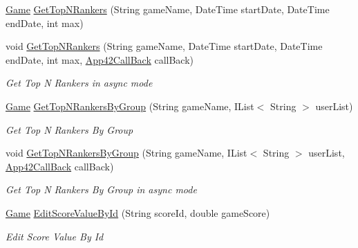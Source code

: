 \begin{DoxyCompactItemize}
\hyperlink{classcom_1_1shephertz_1_1app42_1_1paas_1_1sdk_1_1csharp_1_1game_1_1_game}{Game} \hyperlink{classcom_1_1shephertz_1_1app42_1_1paas_1_1sdk_1_1csharp_1_1game_1_1_score_board_service_a8f16740fe5aaf8096a8b9995406770f5}{Get\+Top\+N\+Rankers} (String game\+Name, Date\+Time start\+Date, Date\+Time end\+Date, int max)
\item 
void \hyperlink{classcom_1_1shephertz_1_1app42_1_1paas_1_1sdk_1_1csharp_1_1game_1_1_score_board_service_a71121ca4dfe87e7fe243c1a5c29c5d7a}{Get\+Top\+N\+Rankers} (String game\+Name, Date\+Time start\+Date, Date\+Time end\+Date, int max, \hyperlink{interfacecom_1_1shephertz_1_1app42_1_1paas_1_1sdk_1_1csharp_1_1_app42_call_back}{App42\+Call\+Back} call\+Back)
\begin{DoxyCompactList}\small\item\em Get Top N Rankers in async mode \end{DoxyCompactList}\item 
\hyperlink{classcom_1_1shephertz_1_1app42_1_1paas_1_1sdk_1_1csharp_1_1game_1_1_game}{Game} \hyperlink{classcom_1_1shephertz_1_1app42_1_1paas_1_1sdk_1_1csharp_1_1game_1_1_score_board_service_a48ba8718c9c942df371cb8f7cde6bf56}{Get\+Top\+N\+Rankers\+By\+Group} (String game\+Name, I\+List$<$ String $>$ user\+List)
\begin{DoxyCompactList}\small\item\em Get Top N Rankers By Group \end{DoxyCompactList}\item 
void \hyperlink{classcom_1_1shephertz_1_1app42_1_1paas_1_1sdk_1_1csharp_1_1game_1_1_score_board_service_a5588cc0cf1857dfdd5f35bbf82ac631f}{Get\+Top\+N\+Rankers\+By\+Group} (String game\+Name, I\+List$<$ String $>$ user\+List, \hyperlink{interfacecom_1_1shephertz_1_1app42_1_1paas_1_1sdk_1_1csharp_1_1_app42_call_back}{App42\+Call\+Back} call\+Back)
\begin{DoxyCompactList}\small\item\em Get Top N Rankers By Group in async mode \end{DoxyCompactList}\item 
\hyperlink{classcom_1_1shephertz_1_1app42_1_1paas_1_1sdk_1_1csharp_1_1game_1_1_game}{Game} \hyperlink{classcom_1_1shephertz_1_1app42_1_1paas_1_1sdk_1_1csharp_1_1game_1_1_score_board_service_ab72a6db7c8cdb0767c087e5845a7cac5}{Edit\+Score\+Value\+By\+Id} (String score\+Id, double game\+Score)
\begin{DoxyCompactList}\small\item\em Edit Score Value By Id \end{DoxyCompactList}\item 

\end{DoxyCompactItemize}

